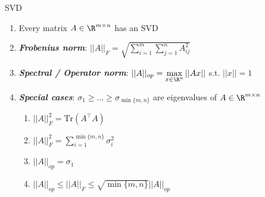 \setcounter{all}{5}
\begin{properties}[]{SVD}
    \begin{enumerate}
        \item \inlinetheorem Every matrix $A \in \R^{m \times n}$ has an SVD
        \item \setcounter{all}{1}\setcounter{subsection}{2}\shortdef \textbf{\textit{Frobenius norm}}: $\displaystyle ||A||_F = \sqrt{\sum_{i = 1}^{m}\sum_{j = 1}^{n} A^2_{ij}}$
        \item \setcounter{all}{1}\shortdef \textbf{\textit{Spectral / Operator norm}}: $\displaystyle ||A||_{op} = \max_{x \in \R^n}||Ax||$ s.t. $||x|| = 1$
        \item \textbf{\textit{Special cases}}: $\sigma_1 \geq \ldots \geq \sigma_{\min\{m, n\}}$ are eigenvalues of $A \in \R^{m \times n}$
        \begin{multicols}{2}
            \begin{enumerate}
                \item $||A||_F^2 = \text{Tr}(A^{\top}A)$
                \item $||A||_F^2 = \displaystyle\sum_{i = 1}^{\min\{m, n\}} \sigma_i^2$
                \item $||A||_{op} = \sigma_1$
                \item $||A||_{op} \leq ||A||_F \leq \sqrt{\min\{m, n\}}||A||_{op}$
            \end{enumerate}
        \end{multicols}
    \end{enumerate}
\end{properties}



